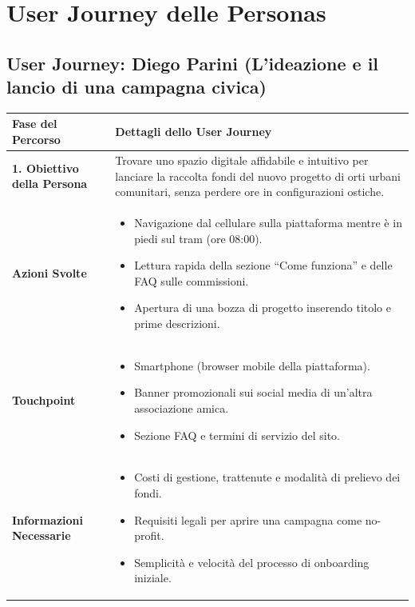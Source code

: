 \documentclass[11pt,a4paper]{article}
\begin{document}
    \section{User Journey delle Personas}

\subsection{User Journey: Diego Parini (L'ideazione e il lancio di una campagna civica)}

\begin{table}[h!]
\centering
\small
\begin{tabular}{|p{3.2cm}|p{11.8cm}|}
\hline
\textbf{Fase del Percorso} & \textbf{Dettagli dello User Journey} \\ \hline
\hline
\textbf{1. Obiettivo della Persona} & Trovare uno spazio digitale affidabile e intuitivo per lanciare la raccolta fondi del nuovo progetto di orti urbani comunitari, senza perdere ore in configurazioni ostiche. \\ \hline
\textbf{Azioni Svolte} &
\begin{itemize}[leftmargin=*,nosep]
    \item Navigazione dal cellulare sulla piattaforma mentre è in piedi sul tram (ore 08:00).
    \item Lettura rapida della sezione ``Come funziona'' e delle FAQ sulle commissioni.
    \item Apertura di una bozza di progetto inserendo titolo e prime descrizioni.
\end{itemize} \\ \hline
\textbf{Touchpoint} &
\begin{itemize}[leftmargin=*,nosep]
    \item Smartphone (browser mobile della piattaforma).
    \item Banner promozionali sui social media di un'altra associazione amica.
    \item Sezione FAQ e termini di servizio del sito.
\end{itemize} \\ \hline
\textbf{Informazioni Necessarie} &
\begin{itemize}[leftmargin=*,nosep]
    \item Costi di gestione, trattenute e modalità di prelievo dei fondi.
    \item Requisiti legali per aprire una campagna come no-profit.
    \item Semplicità e velocità del processo di onboarding iniziale.

\end{itemize}
\end{tabular}
\end{table}
\end{document}
